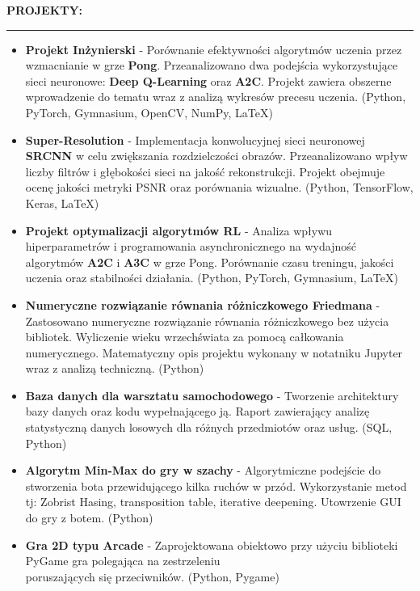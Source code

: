\documentclass[10pt]{article}
\newcommand{\longline}{\rule{19.6cm}{1pt}}
\begin{document}
\noindent \fontsize{14pt}{14pt}\selectfont \textbf{\color{Violet}PROJEKTY:}
\fontsize{10pt}{10pt}\selectfont
\\
\noindent \longline 
\begin{itemize}[leftmargin=*]
    \item \textbf{Projekt Inżynierski} - Porównanie efektywności algorytmów uczenia przez wzmacnianie w grze \textbf{Pong}. 
    Przeanalizowano dwa podejścia wykorzystujące sieci neuronowe: \textbf{Deep Q-Learning} oraz \textbf{A2C}.
    Projekt zawiera obszerne wprowadzenie do tematu wraz z analizą wykresów precesu uczenia. (Python, PyTorch, Gymnasium, OpenCV, NumPy, LaTeX)
    \item \textbf{Super-Resolution} - Implementacja konwolucyjnej sieci neuronowej \textbf{SRCNN} w celu zwiększania rozdzielczości obrazów.
    Przeanalizowano wpływ liczby filtrów i głębokości sieci na jakość rekonstrukcji. Projekt obejmuje ocenę jakości metryki PSNR oraz porównania wizualne. (Python, TensorFlow, Keras, LaTeX)
    \item \textbf{Projekt optymalizacji algorytmów RL} - Analiza wpływu hiperparametrów i programowania asynchronicznego na wydajność algorytmów \textbf{A2C} i \textbf{A3C} w grze Pong. 
    Porównanie czasu treningu, jakości uczenia oraz stabilności działania. (Python, PyTorch, Gymnasium, LaTeX)
    \item \textbf{Numeryczne rozwiązanie równania różniczkowego Friedmana} - Zastosowano numeryczne rozwiązanie równania różniczkowego bez użycia bibliotek.
    Wyliczenie wieku wrzechświata za pomocą całkowania numerycznego. Matematyczny opis projektu wykonany w notatniku Jupyter wraz z analizą techniczną. (Python)
    \item \textbf{Baza danych dla warsztatu samochodowego} - Tworzenie architektury bazy danych oraz kodu wypełnającego ją. 
    Raport zawierający analizę statystyczną danych losowych dla różnych przedmiotów oraz usług. (SQL, Python)
    \item \textbf{Algorytm Min-Max do gry w szachy} - Algorytmiczne podejście do stworzenia bota przewidującego kilka ruchów w przód.
    Wykorzystanie metod tj: Zobrist Hasing, transposition table, iterative deepening. Utowrzenie GUI do gry z botem. (Python)
    \item \textbf{Gra 2D typu Arcade} - Zaprojektowana obiektowo przy użyciu biblioteki PyGame gra polegająca na zestrzeleniu \\ poruszających się przeciwników. (Python, Pygame)
\end{itemize}
\end{document}
